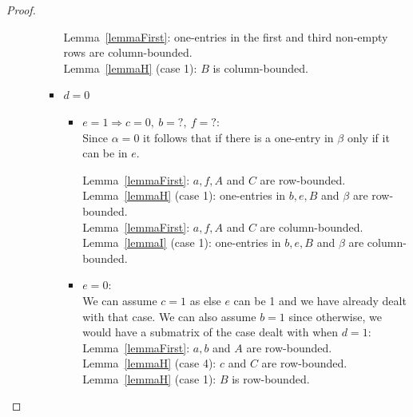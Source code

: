 \begin{proof}
\begin{itemize}
\begin{itemize}
\begin{itemize}
						Lemma~\ref{lemmaFirst}: one-entries in the first and third non-empty rows are column-bounded.\\
						Lemma~\ref{lemmaH} (case 1): $B$ is column-bounded.
					\item $d=0$
						\begin{itemize}
							\item $e=1\Rightarrow c=0,\ b=?,\ f=?$:\\
								Since $\alpha=0$ it follows that if there is a one-entry in $\beta$ only if it can be in $e$.
								
								Lemma~\ref{lemmaFirst}: $a,f,A$ and $C$ are row-bounded.\\
								Lemma~\ref{lemmaH} (case 1): one-entries in $b,e,B$ and $\beta$ are row-bounded. \\
								
								Lemma~\ref{lemmaFirst}: $a,f,A$ and $C$ are column-bounded.\\
								Lemma~\ref{lemmaI} (case 1): one-entries in $b,e,B$ and $\beta$ are column-bounded.
							\item $e=0$:\\
								We can assume $c=1$ as else $e$ can be 1 and we have already dealt with that case. We can also assume $b=1$ since otherwise, we would have a submatrix of the case dealt with when $d=1$:\\
								Lemma~\ref{lemmaFirst}: $a,b$ and $A$ are row-bounded.\\
								Lemma~\ref{lemmaH} (case 4): $c$ and $C$ are row-bounded.\\
								Lemma~\ref{lemmaH} (case 1): $B$ is row-bounded.\\
										

\end{itemize}
\end{itemize}
\end{itemize}
\end{itemize}
\end{proof}
